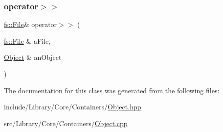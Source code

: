 \mbox{\label{classlibrary_1_1core_1_1ctnr_1_1_object_ad91e1957f0afd5d49dde0b81d11a66e1}} 
\subsubsection{\texorpdfstring{operator$>$$>$}{operator>>}}
{\footnotesize\ttfamily \mbox{\hyperlink{classlibrary_1_1core_1_1fs_1_1_file}{fs\+::\+File}}\& operator$>$$>$ (\begin{DoxyParamCaption}\item[{\mbox{\hyperlink{classlibrary_1_1core_1_1fs_1_1_file}{fs\+::\+File}} \&}]{a\+File,  }\item[{\mbox{\hyperlink{classlibrary_1_1core_1_1ctnr_1_1_object}{Object}} \&}]{an\+Object }\end{DoxyParamCaption})\hspace{0.3cm}{\ttfamily [friend]}}



The documentation for this class was generated from the following files\+:\begin{DoxyCompactItemize}
\item 
include/\+Library/\+Core/\+Containers/\mbox{\hyperlink{_object_8hpp}{Object.\+hpp}}\item 
src/\+Library/\+Core/\+Containers/\mbox{\hyperlink{_object_8cpp}{Object.\+cpp}}\end{DoxyCompactItemize}
